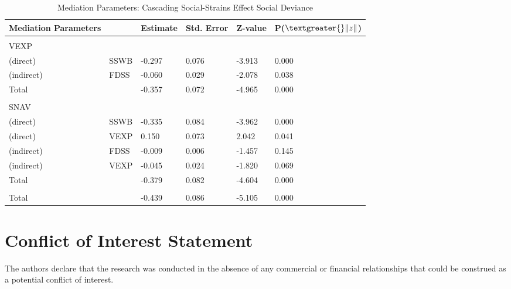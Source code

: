 \documentclass[utf8]{article}
\begin{document}
\begin{table}[]
\begin{tabular}{llllll}
Mediation Parameters &      & Estimate & Std. Error & Z-value & P($\textgreater{}\|z\|$) \\ \hline
                     &      &          &            &         &                          \\
VEXP                 &      &          &            &         &                          \\
(direct)             & SSWB & -0.297   & 0.076      & -3.913  & 0.000                    \\
(indirect)           & FDSS & -0.060   & 0.029      & -2.078  & 0.038                    \\
Total                &      & -0.357   & 0.072      & -4.965  & 0.000                    \\
                     &      &          &            &         &                          \\
SNAV                 &      &          &            &         &                          \\
(direct)             & SSWB & -0.335   & 0.084      & -3.962  & 0.000                    \\
(direct)             & VEXP & 0.150    & 0.073      & 2.042   & 0.041                    \\
(indirect)           & FDSS & -0.009   & 0.006      & -1.457  & 0.145                    \\
(indirect)           & VEXP & -0.045   & 0.024      & -1.820  & 0.069                    \\
Total                &      & -0.379   & 0.082      & -4.604  & 0.000                    \\
                     &      &          &            &         &                          \\
Total                &      & -0.439   & 0.086      & -5.105  & 0.000                   
\end{tabular}
\caption{Mediation Parameters: Cascading Social-Strains Effect Social Deviance\label{tab:14}}
\end{table}

\section*{Conflict of Interest Statement}
The authors declare that the research was conducted in the absence of any commercial or financial relationships that could be construed as a potential conflict of interest.
\end{document}
